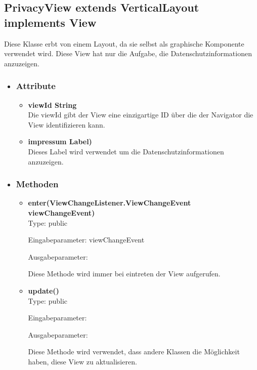 \newpage
\subsection{PrivacyView extends VerticalLayout implements View}
Diese Klasse erbt von einem Layout, da sie selbst als graphische Komponente verwendet wird. Diese View hat nur die Aufgabe, die Datenschutzinformationen anzuzeigen.

\begin{itemize}
\item \subsubsection{Attribute}
\begin{itemize}
\item \textbf{viewId String} \hfill\\ 
Die viewId gibt der View eine einzigartige ID über die der Navigator die View identifizieren kann.

\item \textbf{impressum Label)} \hfill\\ 
Dieses Label wird verwendet um die Datenschutzinformationen anzuzeigen.

\end{itemize}

\item \subsubsection{Methoden}
\begin{itemize}
\item \textbf{enter(ViewChangeListener.ViewChangeEvent viewChangeEvent)}\hfill\\
Type: public

Eingabeparameter: viewChangeEvent

Ausgabeparameter:

Diese Methode wird immer bei eintreten der View aufgerufen.



\item \textbf{update()} \hfill\\ 
Type: public

Eingabeparameter:

Ausgabeparameter:

Diese Methode wird verwendet, dass andere Klassen die Möglichkeit haben, diese View zu aktualisieren.
\end{itemize}

\end{itemize}